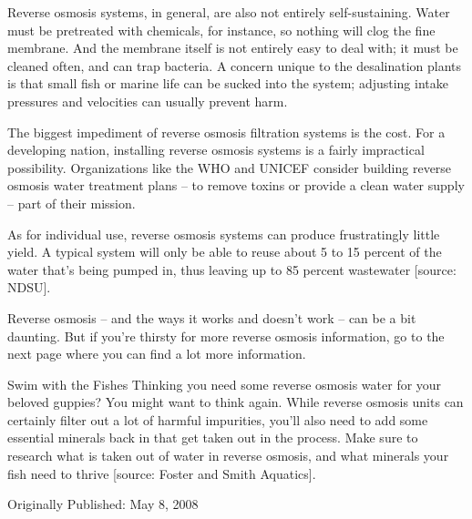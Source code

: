 Reverse osmosis systems, in general, are also not entirely self-sustaining. Water must be pretreated with chemicals, for instance, so nothing will clog the fine membrane. And the membrane itself is not entirely easy to deal with; it must be cleaned often, and can trap bacteria. A concern unique to the desalination plants is that small fish or marine life can be sucked into the system; adjusting intake pressures and velocities can usually prevent harm.

The biggest impediment of reverse osmosis filtration systems is the cost. For a developing nation, installing reverse osmosis systems is a fairly impractical possibility. Organizations like the WHO and UNICEF consider building reverse osmosis water treatment plans -- to remove toxins or provide a clean water supply -- part of their mission.

As for individual use, reverse osmosis systems can produce frustratingly little yield. A typical system will only be able to reuse about 5 to 15 percent of the water that's being pumped in, thus leaving up to 85 percent wastewater [source: NDSU].

Reverse osmosis -- and the ways it works and doesn't work -- can be a bit daunting. But if you're thirsty for more reverse osmosis information, go to the next page where you can find a lot more information.

Swim with the Fishes
Thinking you need some reverse osmosis water for your beloved guppies? You might want to think again. While reverse osmosis units can certainly filter out a lot of harmful impurities, you'll also need to add some essential minerals back in that get taken out in the process. Make sure to research what is taken out of water in reverse osmosis, and what minerals your fish need to thrive [source: Foster and Smith Aquatics].

Originally Published: May 8, 2008

